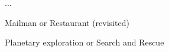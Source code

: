 ...

\begin{myExample}\label{Ex:mission1}
	Mailman or Restaurant (revisited)
\end{myExample}

\begin{myExample}\label{Ex:mission2}
	Planetary exploration or Search and Rescue
\end{myExample}